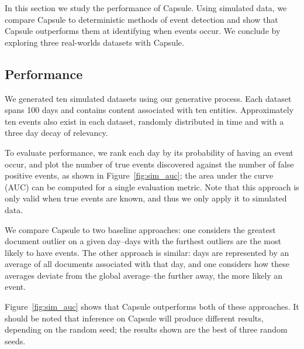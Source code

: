 In this section we study the performance of Capsule. Using simulated data, we compare Capsule to deterministic methods of event detection and show that Capsule outperforms them at identifying when events occur.  
We conclude by exploring three real-worlds datasets with Capsule.

\subsection{Performance}

We generated ten simulated datasets using our generative process.  Each dataset spans 100 days and contains content associated with ten entities.  Approximately ten events also exist in each dataset, randomly distributed in time and with a three day decay of relevancy.

To evaluate performance, we rank each day by its probability of having an event occur, and plot the number of true events discovered against the number of false positive events, as shown in Figure~\ref{fig:sim_auc}; the area under the curve (AUC) can be computed for a single evaluation metric.  Note that this approach is only valid when true events are known, and thus we only apply it to simulated data.

We compare Capsule to two baseline approaches: one considers the greatest document outlier on a given day--days with the furthest outliers are the most likely to have events.  The other approach is similar: days are represented by an average of all documents associated with that day, and one considers how these averages deviate from the global average--the further away, the more likely an event.

Figure~\ref{fig:sim_auc} shows that Capsule outperforms both of these approaches.  It should be noted that inference on Capsule will produce different results, depending on the random seed; the results shown are the best of three random seeds.

